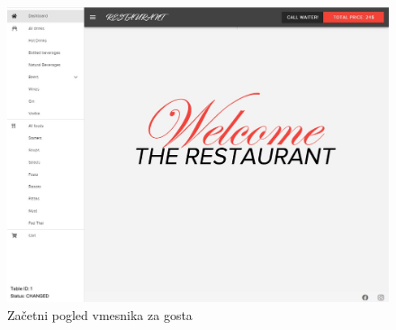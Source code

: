 \documentclass[a4paper, 12pt]{book}
\begin{document}
\begin{figure}[!htb]
\centering
\includegraphics[width=13.7cm]{gost_zacetek.jpg}
\caption{Začetni pogled vmesnika za gosta}
\label{Gost_zac}
\end{figure}
\end{document}
